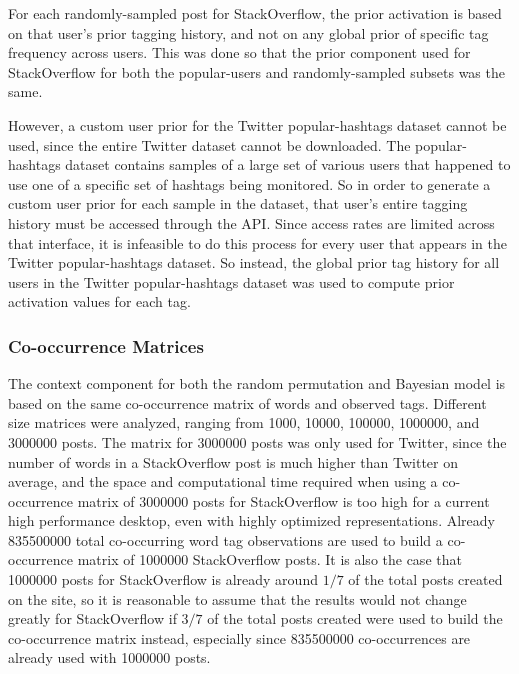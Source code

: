 \documentclass[man,floatsintext,donotrepeattitle]{apa6}
\begin{document}
For each randomly-sampled post for StackOverflow, the prior activation is based on that user's prior tagging history, and not on any global prior of specific tag frequency across users.
This was done so that the prior component used for StackOverflow for both the popular-users and randomly-sampled subsets was the same.

However, a custom user prior for the Twitter popular-hashtags dataset cannot be used, since the entire Twitter dataset cannot be downloaded.
The popular-hashtags dataset contains samples of a large set of various users that happened to use one of a specific set of hashtags being monitored.
So in order to generate a custom user prior for each sample in the dataset, that user's entire tagging history must be accessed through the API.
Since access rates are limited across that interface, it is infeasible to do this process for every user that appears in the Twitter popular-hashtags dataset.
So instead, the global prior tag history for all users in the Twitter popular-hashtags dataset was used to compute prior activation values for each tag.

\subsubsection{Co-occurrence Matrices}

The context component for both the random permutation and Bayesian model is based on the same co-occurrence matrix of words and observed tags.
Different size matrices were analyzed, ranging from \num{1000}, \num{10000}, \num{100000}, \num{1000000}, and \num{3000000} posts.
The matrix for \num{3000000} posts was only used for Twitter, since the number of words in a StackOverflow post is much higher than Twitter on average,
and the space and computational time required when using a co-occurrence matrix of \num{3000000} posts for StackOverflow is too high for a current high performance desktop, even with highly optimized representations.
Already \num{835500000} total co-occurring word tag observations are used to build a co-occurrence matrix of \num{1000000} StackOverflow posts.
It is also the case that \num{1000000} posts for StackOverflow is already around $1/7$ of the total posts created on the site,
so it is reasonable to assume that the results would not change greatly for StackOverflow if $3/7$ of the total posts created were used to build the co-occurrence matrix instead,
especially since \num{835500000} co-occurrences are already used with \num{1000000} posts.
\end{document}
